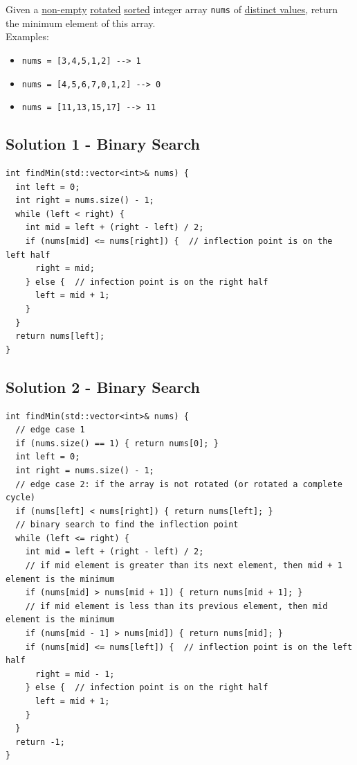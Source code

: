 Given a \ul{non-empty} \ul{rotated} \ul{sorted} integer array {\colorbox{CodeBackground}{\lstinline|nums|}} of \ul{distinct values}, return the minimum element of this array. \\

Examples:
\begin{itemize}
	\item {\colorbox{CodeBackground}{\lstinline|nums = [3,4,5,1,2] --> 1|}}
	\item {\colorbox{CodeBackground}{\lstinline|nums = [4,5,6,7,0,1,2] --> 0|}}
	\item {\colorbox{CodeBackground}{\lstinline|nums = [11,13,15,17] --> 11|}}
\end{itemize}

\subsection*{Solution 1 - Binary Search}
\begin{lstlisting}
int findMin(std::vector<int>& nums) {
  int left = 0;
  int right = nums.size() - 1;
  while (left < right) {
    int mid = left + (right - left) / 2;
    if (nums[mid] <= nums[right]) {  // inflection point is on the left half
      right = mid;
    } else {  // infection point is on the right half
      left = mid + 1;
    }
  }
  return nums[left];
}
\end{lstlisting}

\subsection*{Solution 2 - Binary Search}
\begin{lstlisting}
int findMin(std::vector<int>& nums) {
  // edge case 1
  if (nums.size() == 1) { return nums[0]; }
  int left = 0;
  int right = nums.size() - 1;
  // edge case 2: if the array is not rotated (or rotated a complete cycle)
  if (nums[left] < nums[right]) { return nums[left]; }
  // binary search to find the inflection point
  while (left <= right) {
    int mid = left + (right - left) / 2;
    // if mid element is greater than its next element, then mid + 1 element is the minimum
    if (nums[mid] > nums[mid + 1]) { return nums[mid + 1]; }
    // if mid element is less than its previous element, then mid element is the minimum
    if (nums[mid - 1] > nums[mid]) { return nums[mid]; }
    if (nums[mid] <= nums[left]) {  // inflection point is on the left half
      right = mid - 1;
    } else {  // infection point is on the right half
      left = mid + 1;
    }
  }
  return -1;
}
\end{lstlisting}

